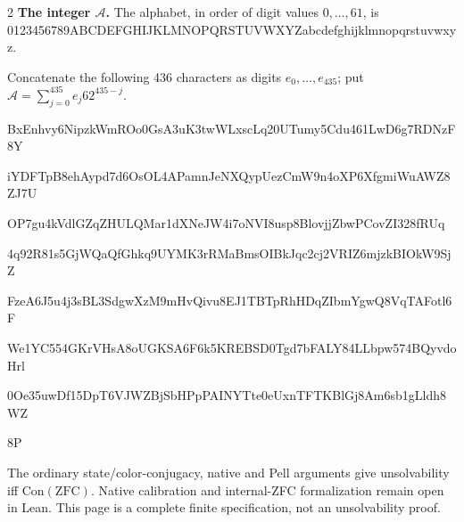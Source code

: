 \documentclass[10pt]{article}
\begin{document}
\begin{multicols}{2}
\textbf{The integer $\mathcal A$.}
The alphabet, in order of digit values $0,\ldots,61$, is
{\fontsize{7.7}{8.2}\selectfont\ttfamily 0123456789ABCDEFGHIJKLMNOPQRSTUVWXYZabcdefghijklmnopqrstuvwxyz}.\par
Concatenate the following 436 characters as digits $e_0,\ldots,e_{435}$;
put $\mathcal A=\sum_{j=0}^{435}e_j62^{435-j}$.\par
\begingroup\fontsize{7.7}{8.2}\selectfont\ttfamily
BxEnhvy6NipzkWmROo0GsA3uK3twWLxscLq20UTumy5Cdu461LwD6g7RDNzF8Y\par
iYDFTpB8ehAypd7d6OsOL4APamnJeNXQypUezCmW9n4oXP6XfgmiWuAWZ8ZJ7U\par
OP7gu4kVdlGZqZHULQMar1dXNeJW4i7oNVI8usp8BlovjjZbwPCovZI328fRUq\par
4q92R81s5GjWQaQfGhkq9UYMK3rRMaBmsOIBkJqc2cj2VRIZ6mjzkBIOkW9SjZ\par
FzeA6J5u4j3sBL3SdgwXzM9mHvQivu8EJ1TBTpRhHDqZIbmYgwQ8VqTAFotl6F\par
We1YC554GKrVHsA8oUGKSA6F6k5KREBSD0Tgd7bFALY84LLbpw574BQyvdoHrl\par
0Oe35uwDf15DpT6VJWZBjSbHPpPAINYTte0eUxnTFTKBlGj8Am6sb1gLldh8WZ\par
8P\par
\endgroup
\normalfont\fontsize{7.7}{8.2}\selectfont
The ordinary state/color-conjugacy, native and Pell arguments give
unsolvability iff $\mathrm{Con}(\mathrm{ZFC})$.
Native calibration and internal-ZFC formalization remain open in Lean.
This page is a complete finite specification, not an unsolvability proof.
\end{multicols}
\end{document}
